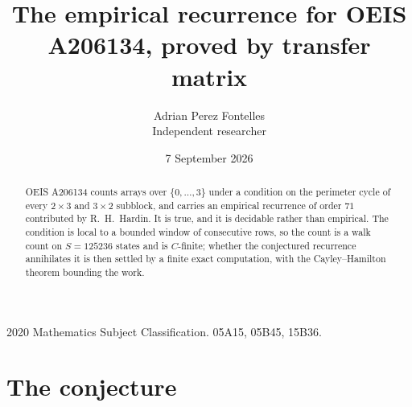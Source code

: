 \documentclass[11pt,a4paper]{article}
\title{The empirical recurrence for OEIS A206134, proved by transfer matrix}
\author{Adrian Perez Fontelles\\ \small Independent researcher}
\date{7 September 2026}
\theoremstyle{plain}
\theoremstyle{definition}
\begin{document}
\maketitle

\begin{abstract}
OEIS A206134 counts arrays over $\{0,\dots,3\}$ under a condition on the perimeter cycle of
every $2\times3$ and $3\times2$ subblock, and carries an empirical recurrence of order $71$ contributed by
R.~H.~Hardin. It is true, and it is decidable rather than empirical. The condition is local to
a bounded window of consecutive rows, so the count is a walk count on $S=125236$ states and is
$C$-finite; whether the conjectured recurrence annihilates it is then settled by a finite exact
computation, with the Cayley--Hamilton theorem bounding the work.
\end{abstract}

\noindent\small 2020 Mathematics Subject Classification. 05A15, 05B45, 15B36.\normalsize

\section{The conjecture}
\end{document}
